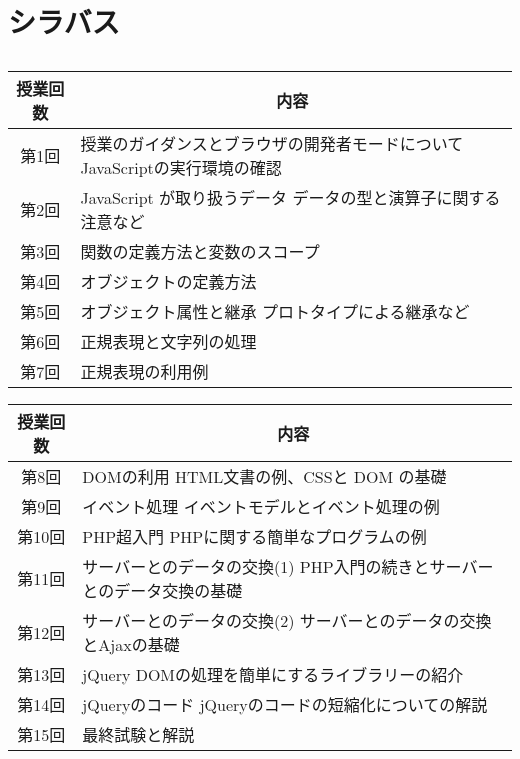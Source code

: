 \section{シラバス}\subsection{}
\begin{frame}
 \begin{center}
\begin{tabular}{|c|m{}|}\hline
 授業回数&\multicolumn{1}{c|}{内容}\\\hline
  第1回&授業のガイダンスとブラウザの開発者モードについて \newline
     JavaScriptの実行環境の確認\\\hline
 第2回&JavaScript が取り扱うデータ\newline
     データの型と演算子に関する注意など\\\hline
 第3回& 関数の定義方法と変数のスコープ\\\hline
 第4回& オブジェクトの定義方法\\\hline
 第5回&オブジェクト属性と継承\newline
     プロトタイプによる継承など\\\hline
 第6回&正規表現と文字列の処理  \\\hline
 第7回&正規表現の利用例 \\\hline
\end{tabular}
\end{center}
\end{frame}
\begin{frame}
 \begin{center}
\begin{tabular}{|c|m{}|}\hline
 授業回数&\multicolumn{1}{c|}{内容}\\\hline
 第8回&DOMの利用\newline
     HTML文書の例、CSSと DOM の基礎\\\hline
 第9回&イベント処理 \newline
     イベントモデルとイベント処理の例\\\hline
 第10回&PHP超入門\newline
       PHPに関する簡単なプログラムの例\\\hline
 第11回&サーバーとのデータの交換(1)\newline
     PHP入門の続きとサーバーとのデータ交換の基礎\\\hline
 第12回&サーバーとのデータの交換(2)\newline
     サーバーとのデータの交換とAjaxの基礎\\\hline
 第13回&jQuery \newline
     DOMの処理を簡単にするライブラリーの紹介\\   \hline
 第14回&jQueryのコード\newline
     jQueryのコードの短縮化についての解説 \\\hline
 第15回&最終試験と解説\\ \hline
\end{tabular}
\end{center}
\end{frame}
